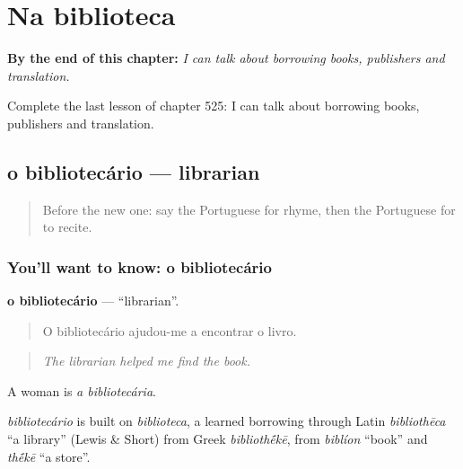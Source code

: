 
\chapter{Na biblioteca}
\label{ch:pt-na-biblioteca}

\begin{chapteropening}
\textbf{By the end of this chapter:} \emph{I can talk about borrowing books, publishers and translation.}

Complete the last lesson of chapter 525: I can talk about borrowing books, publishers and translation.
\end{chapteropening}

\section[o bibliotecário]{o bibliotecário — librarian}

\label{lesson:PT-C525-bibliotecario}



\begin{quote}
Before the new one: say the Portuguese for rhyme, then the Portuguese for to recite.
\end{quote}

\subsection*{You'll want to know: o bibliotecário}
\textbf{o bibliotecário} — \textquotedblleft{}librarian\textquotedblright{}.

\begin{quote}
O bibliotecário ajudou-me a encontrar o livro.
\end{quote}

\begin{quote}
\emph{The librarian helped me find the book.}
\end{quote}

A woman is \emph{a bibliotecária}.

\begin{cousinweb}
\emph{bibliotecário} is built on \emph{biblioteca}, a learned borrowing through Latin \emph{bibliothēca} \textquotedblleft{}a library\textquotedblright{} (Lewis \& Short) from Greek \emph{biblioth\'{\={e}}kē}, from \emph{biblíon} \textquotedblleft{}book\textquotedblright{} and \emph{th\'{\={e}}kē} \textquotedblleft{}a store\textquotedblright{}.
\end{cousinweb}

